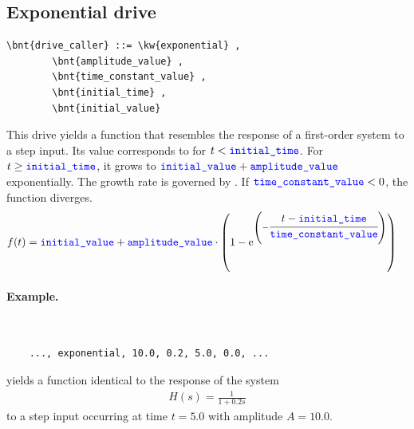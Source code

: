\subsection{Exponential drive}
\begin{Verbatim}[commandchars=\\\{\}]
    \bnt{drive_caller} ::= \kw{exponential} ,
        \bnt{amplitude_value} ,
        \bnt{time_constant_value} ,
        \bnt{initial_time} ,
        \bnt{initial_value}
\end{Verbatim}
This drive yields a function that resembles the response
of a first-order system to a step input.
Its value corresponds to 
for $t < \textcolor{blue}{\texttt{initial\_time}}$.
For $t \ge \textcolor{blue}{\texttt{initial\_time}}$, it grows to
$\textcolor{blue}{\texttt{initial\_value}} + \textcolor{blue}{\texttt{amplitude\_value}}$
exponentially.
The growth rate is governed by .
If $\textcolor{blue}{\texttt{time\_constant\_value}} < 0$, the function diverges.
\begin{align}
	f(t)
	&=
	\textcolor{blue}{\texttt{initial\_value}}
	+ \textcolor{blue}{\texttt{amplitude\_value}} \cdot \left( 
		1 - \text{e}^{\left( -\cfrac{t - \textcolor{blue}{\texttt{initial\_time}}}{\textcolor{blue}{\texttt{time\_constant\_value}}} \right)}
	 \right)
\end{align}

\paragraph{Example.} \
\begin{verbatim}
    ..., exponential, 10.0, 0.2, 5.0, 0.0, ...
\end{verbatim}
yields a function identical to the response of the system
\begin{align}
	H(s) = \frac{1}{1 + 0.2 s}
\end{align}
to a step input occurring at time $t=5.0$ with amplitude $A=10.0$.

